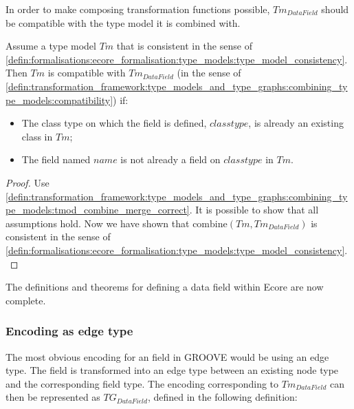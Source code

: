 In order to make composing transformation functions possible, $Tm_{DataField}$ should be compatible with the type model it is combined with.

\begin{thm}
\label{defin:library_of_transformations:type_level_transformations:data_fields:tmod_data_field_combine_correct}
Assume a type model $Tm$ that is consistent in the sense of \cref{defin:formalisations:ecore_formalisation:type_models:type_model_consistency}. Then $Tm$ is compatible with $Tm_{DataField}$ (in the sense of \cref{defin:transformation_framework:type_models_and_type_graphs:combining_type_models:compatibility}) if:
\begin{itemize}
    \item The class type on which the field is defined, $classtype$, is already an existing class in $Tm$;
    \item The field named $name$ is not already a field on $classtype$ in $Tm$.
\end{itemize}
\end{thm}

\begin{proof}
Use \cref{defin:transformation_framework:type_models_and_type_graphs:combining_type_models:tmod_combine_merge_correct}. It is possible to show that all assumptions hold. Now we have shown that $\mathrm{combine}(Tm, Tm_{DataField})$ is consistent in the sense of \cref{defin:formalisations:ecore_formalisation:type_models:type_model_consistency}.
\end{proof}

The definitions and theorems for defining a data field within Ecore are now complete. 

\subsubsection{Encoding as edge type}

The most obvious encoding for an field in GROOVE would be using an edge type. The field is transformed into an edge type between an existing node type and the corresponding field type. The encoding corresponding to $Tm_{DataField}$ can then be represented as $TG_{DataField}$, defined in the following definition:

